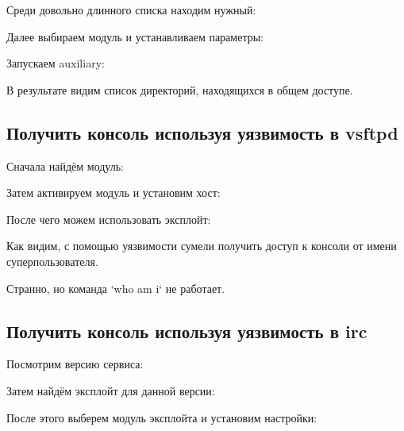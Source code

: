 \documentclass[a4paper]{article}
\begin{document}


Среди довольно длинного списка находим нужный:



Далее выбираем модуль и устанавливаем параметры:



Запускаем auxiliary:



В результате видим список директорий, находящихся в общем доступе.

\subsection{Получить консоль используя уязвимость в vsftpd}

Сначала найдём модуль:



Затем активируем модуль и установим хост:



После чего можем использовать эксплойт:



Как видим, с помощью уязвимости сумели получить доступ к консоли от имени суперпользователя.

Странно, но команда `who am i` не работает.

\subsection{Получить консоль используя уязвимость в irc}

Посмотрим версию сервиса:



Затем найдём эксплойт для данной версии:



После этого выберем модуль эксплойта и установим настройки:
\end{document}
